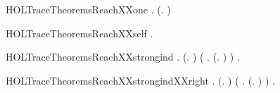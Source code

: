 \begin{SaveVerbatim}{HOLTraceTheoremsReachXXone}
\HOLTokenTurnstile{} \HOLSymConst{\HOLTokenForall{}} . (\HOLSymConst{\HOLTokenExists{}}.  \HOLTokenTransBegin{}\HOLTokenTransEnd {}) \HOLSymConst{\HOLTokenImp{}}   
\end{SaveVerbatim}
\newcommand{\HOLTraceTheoremsReachXXone}{\UseVerbatim{HOLTraceTheoremsReachXXone}}
\begin{SaveVerbatim}{HOLTraceTheoremsReachXXself}
\HOLTokenTurnstile{} \HOLSymConst{\HOLTokenForall{}}.   
\end{SaveVerbatim}
\newcommand{\HOLTraceTheoremsReachXXself}{\UseVerbatim{HOLTraceTheoremsReachXXself}}
\begin{SaveVerbatim}{HOLTraceTheoremsReachXXstrongind}
\HOLTokenTurnstile{} \HOLSymConst{\HOLTokenForall{}}.
       (\HOLSymConst{\HOLTokenForall{}}.   ) \HOLSymConst{\HOLTokenConj{}}
       (\HOLSymConst{\HOLTokenForall{}}  . (\HOLSymConst{\HOLTokenExists{}}.  \HOLTokenTransBegin{}\HOLTokenTransEnd {}) \HOLSymConst{\HOLTokenConj{}}    \HOLSymConst{\HOLTokenConj{}}    \HOLSymConst{\HOLTokenImp{}}   ) \HOLSymConst{\HOLTokenImp{}}
       \HOLSymConst{\HOLTokenForall{}} .    \HOLSymConst{\HOLTokenImp{}}   
\end{SaveVerbatim}
\newcommand{\HOLTraceTheoremsReachXXstrongind}{\UseVerbatim{HOLTraceTheoremsReachXXstrongind}}
\begin{SaveVerbatim}{HOLTraceTheoremsReachXXstrongindXXright}
\HOLTokenTurnstile{} \HOLSymConst{\HOLTokenForall{}}.
       (\HOLSymConst{\HOLTokenForall{}}.   ) \HOLSymConst{\HOLTokenConj{}}
       (\HOLSymConst{\HOLTokenForall{}}  .    \HOLSymConst{\HOLTokenConj{}}    \HOLSymConst{\HOLTokenConj{}} (\HOLSymConst{\HOLTokenExists{}}.  \HOLTokenTransBegin{}\HOLTokenTransEnd {}) \HOLSymConst{\HOLTokenImp{}}   ) \HOLSymConst{\HOLTokenImp{}}
       \HOLSymConst{\HOLTokenForall{}} .    \HOLSymConst{\HOLTokenImp{}}   
\end{SaveVerbatim}
